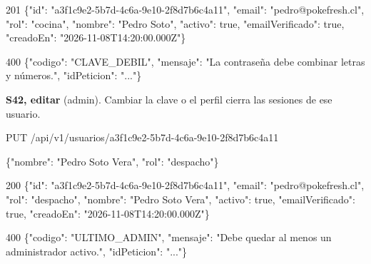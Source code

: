\begin{codigo}
201 \{"id":\allowbreak{} "a3f1c9e2-\allowbreak{}5b7d-\allowbreak{}4c6a-\allowbreak{}9e10-\allowbreak{}2f8d7b6c4a11",\allowbreak{} "email":\allowbreak{} "pedro@pokefresh.\allowbreak{}cl",\allowbreak{} "rol":\allowbreak{} "cocina",\allowbreak{} "nombre":\allowbreak{} "Pedro Soto",\allowbreak{} "activo":\allowbreak{} true,\allowbreak{} "emailVerificado":\allowbreak{} true,\allowbreak{} "creadoEn":\allowbreak{} "2026-\allowbreak{}11-\allowbreak{}08T14:\allowbreak{}20:\allowbreak{}00.\allowbreak{}000Z"\}\par
400 \{"codigo":\allowbreak{} "CLAVE\_\allowbreak{}DEBIL",\allowbreak{} "mensaje":\allowbreak{} "La contraseña debe combinar letras y números.\allowbreak{}",\allowbreak{} "idPeticion":\allowbreak{} ".\allowbreak{}.\allowbreak{}.\allowbreak{}"\}\par
\end{codigo}

\textbf{S42, editar} (admin). Cambiar la clave o el perfil cierra las sesiones de ese usuario.


\begin{codigo}
PUT /\allowbreak{}api/\allowbreak{}v1/\allowbreak{}usuarios/\allowbreak{}a3f1c9e2-\allowbreak{}5b7d-\allowbreak{}4c6a-\allowbreak{}9e10-\allowbreak{}2f8d7b6c4a11\par
\{"nombre":\allowbreak{} "Pedro Soto Vera",\allowbreak{} "rol":\allowbreak{} "despacho"\}\par
\end{codigo}

\begin{codigo}
200 \{"id":\allowbreak{} "a3f1c9e2-\allowbreak{}5b7d-\allowbreak{}4c6a-\allowbreak{}9e10-\allowbreak{}2f8d7b6c4a11",\allowbreak{} "email":\allowbreak{} "pedro@pokefresh.\allowbreak{}cl",\allowbreak{} "rol":\allowbreak{} "despacho",\allowbreak{} "nombre":\allowbreak{} "Pedro Soto Vera",\allowbreak{} "activo":\allowbreak{} true,\allowbreak{} "emailVerificado":\allowbreak{} true,\allowbreak{} "creadoEn":\allowbreak{} "2026-\allowbreak{}11-\allowbreak{}08T14:\allowbreak{}20:\allowbreak{}00.\allowbreak{}000Z"\}\par
400 \{"codigo":\allowbreak{} "ULTIMO\_\allowbreak{}ADMIN",\allowbreak{} "mensaje":\allowbreak{} "Debe quedar al menos un administrador activo.\allowbreak{}",\allowbreak{} "idPeticion":\allowbreak{} ".\allowbreak{}.\allowbreak{}.\allowbreak{}"\}\par
\end{codigo}

